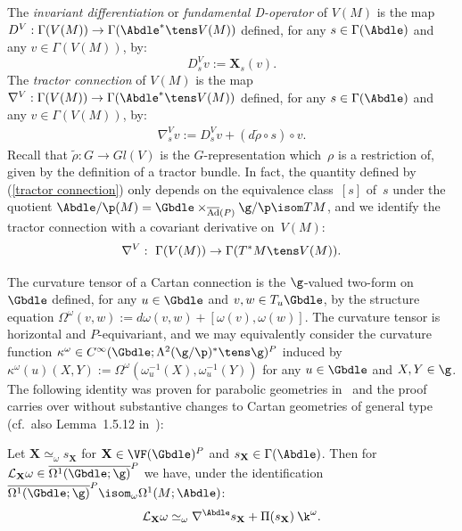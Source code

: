 \begin{Definition} \label{differentiation} The \textit{invariant differentiation} or \textit{fundamental D-operator} of $V(M)$ is the map $D^{V} : \Gamma(V(M)) \rightarrow \Gamma(\Abdle^* \tens V(M))$ def\/ined, for any $s \in \Gamma(\Abdle)$ and any $v \in \Gamma(V(M))$, by:
\[
D_s^{V}v := \mathbf{X}_s(v).
\]
The \textit{tractor connection} of $V(M)$ is the map $\nabla^{V}: \Gamma(V(M)) \rightarrow \Gamma(\Abdle^* \tens V(M))$ def\/ined, for any $s \in \Gamma(\Abdle)$ and any $v \in \Gamma(V(M))$, by:
\begin{gather}
\nabla^{V}_s v := D^{V}_s v + (d\tilde{\rho} \circ s) \circ v. \label{tractor connection}
\end{gather}
 Recall that $\tilde{\rho}: G \rightarrow Gl(V)$ is the $G$-representation which~$\rho$ is a restriction of, given by the def\/inition of a tractor bundle. In fact, the quantity def\/ined by (\ref{tractor connection}) only depends on the equiva\-len\-ce class~$[s]$ of~$s$ under the quotient $\Abdle/\p(M) = \Gbdle \times_{\overline{\mathrm{Ad}}(P)} \g/\p \isom TM$, and we identify the tractor connection with a covariant derivative on~$V(M)$:
\[
\nabla^V: \ \Gamma(V(M)) \rightarrow \Gamma(T^*M \tens V(M)).
\]
\end{Definition}

The curvature tensor of a Cartan connection is the $\g$-valued two-form on $\Gbdle$ def\/ined, for any $u \in \Gbdle$ and $v, w \in T_u\Gbdle$, by the structure equation $\Omega^{\omega}(v,w) := d\omega(v,w) + [\omega(v),\omega(w)]$. The curvature tensor is horizontal and $P$-equivariant, and we may equivalently consider the curvature function $\kappa^{\omega} \in C^{\infty}(\Gbdle;\Lambda^2(\g/\p)^* \tens \g)^P$ induced by $\kappa^{\omega}(u)(X,Y) := \Omega^{\omega}(\omega_u^{-1}(X),\omega_u^{-1}(Y))$ for any $u \in \Gbdle$ and $X,Y \in \g$. The following identity was proven for parabolic geometries in~\cite{Cap inf aut} and the proof carries over without substantive changes to Cartan geometries of general type (cf.\ also Lemma~1.5.12 in~\cite{CSbook}):

\begin{Lemma} \label{infinitesimal deformation} Let $\mathbf{X} \simeq_{\omega} s_{\mathbf{X}}$ for $\mathbf{X} \in \VF(\Gbdle)^P$ and $s_{\mathbf{X}} \in \Gamma(\Abdle)$. Then for $\mathcal{L}_{\mathbf{X}} \omega \in \overline{\Omega^1(\Gbdle;\g)}^P$ we have, under the identification $\overline{\Omega^1(\Gbdle;\g)}^P \isom_{\omega} \Omega^1(M;\Abdle)$:
\begin{gather}
\mathcal{L}_{\mathbf{X}} \omega \simeq_{\omega} \nabla^{\Abdle} s_{\mathbf{X}} + \Pi(s_{\mathbf{X}}) \: \k^{\omega}. \label{infinitesimal deformation identity}
\end{gather}
\end{Lemma}

